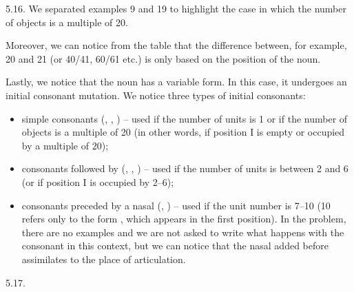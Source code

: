 \begin{refsection}
\begin{practiceproblemsolution}{5.16. \langnameIrish}
 We separated examples 9 and 19 to highlight the case in which the number of objects is a multiple of 20.

 Moreover, we can notice from the table that the difference between, for example, 20 and 21 (or 40/41, 60/61 etc.) is only based on the position of the noun.

Lastly, we notice that the noun has a variable form. In this case, it undergoes an initial consonant mutation. We notice three types of initial consonants:
\begin{itemize}
    \item simple consonants (, , ) -- used if the number of units is 1 or if the number of objects is a multiple of 20 (in other words, if position I is empty or occupied by a multiple of 20);
    \item consonants followed by  (, , ) -- used if the number of units is between 2 and 6 (or if position I is occupied by 2--6);
    \item consonants preceded by a nasal (, ) – used if the unit number is 7--10 (10 refers only to the form , which appears in the first position). In the problem, there are no examples and we are not asked to write what happens with the consonant  in this context, but we can notice that the nasal added before assimilates to the place of articulation.
\end{itemize}



\end{practiceproblemsolution}
\begin{practiceproblemsolution}{5.17. \langnameIaai}


\end{practiceproblemsolution}
\end{refsection}
